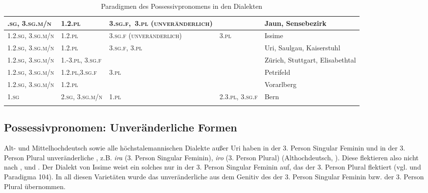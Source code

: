 \begin{table}
\caption{Paradigmen des Possessivpronomens in den Dialekten}\label{table5.33}
\begin{tabularx}{\textwidth}{>{\scshape}X>{\scshape}X>{\scshape}X>{\scshape}XX}
\lsptoprule
1.2.sg, 3.sg.m/n & 1.2.pl & \mbox{3.sg.f, 3.pl} ({\upshape unveränderlich}) &  & Jaun, Sensebezirk\\
\midrule
1.2.sg, 3.sg.m/n & 1.2.pl & 3.sg.f ({\upshape \mbox{unveränder}\-lich}) & 3.pl   & Issime\\
\midrule                                                           
1.2.sg, 3.sg.m/n & 1.2.pl & 3.sg.f, 3.pl &                   & Uri, Saulgau, Kaiserstuhl\\
\midrule                                                           
1.2.sg, 3.sg.m/n & 1.-3.pl, 3.sg.f &  &                       & Zürich, Stuttgart, Elisabethtal\\
\midrule                                                           
1.2.sg, 3.sg.m/n & 1.2.pl,3.sg.f & 3.pl &                    & Petrifeld\\
\midrule                                                           
1.2.sg, 3.sg.m/n & 1.2.pl &  &                                 & Vorarlberg\\
\midrule                                                           
1.sg & 2.sg, 3.sg.m/n & 1.pl & 2.3.pl, 3.sg.f               & Bern\\
\lspbottomrule
\end{tabularx}
\end{table}

\subsection{Possessivpronomen: Unveränderliche Formen}\label{5.6.7}

Alt- und Mittelhochdeutsch sowie alle höchstalemannischen Dialekte außer Uri haben in der 3. Person Singular Feminin und in der 3. Person Plural unveränderliche , z.B. \textit{ira} (3. Person Singular Feminin), \textit{iro} (3. Person Plural) (Althochdeutsch, \citealt[245]{Braune2004}). Diese  flektieren also nicht nach ,  und . Der Dialekt von Issime weist ein solches  nur in der 3. Person Singular Feminin auf, das  der 3. Person Plural flektiert (vgl.  und Paradigma 104). In all diesen Varietäten wurde das unveränderliche  aus dem Genitiv des  der 3. Person Singular Feminin bzw. der 3. Person Plural übernommen.


